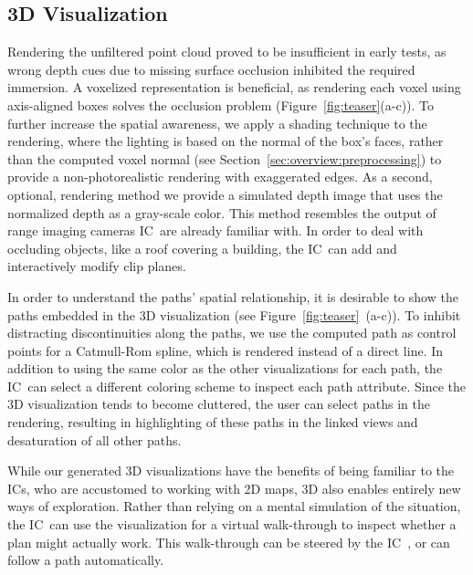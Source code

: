 \documentclass[conference,10pt,letter]{IEEEtran}
\def\IC{IC}
\begin{document}
\subsection{3D Visualization} \label{sec:overview:3dvisualization}
 Rendering the unfiltered point cloud proved to be insufficient in early tests, as wrong depth cues due to missing surface occlusion inhibited the required immersion. A voxelized representation is beneficial, as rendering each voxel using axis-aligned boxes solves the occlusion problem (Figure~\ref{fig:teaser}(a-c)). To further increase the spatial awareness, we apply a shading technique to the rendering, where the lighting is based on the normal of the box's faces, rather than the computed voxel normal (see Section~\ref{sec:overview:preprocessing}) to provide a non-photorealistic rendering with exaggerated edges. As a second, optional, rendering method we provide a simulated depth image that uses the normalized depth as a gray-scale color. This method resembles the output of range imaging cameras \IC\ are already familiar with. In order to deal with occluding objects, like a roof covering a building, the \IC\ can add and interactively modify clip planes.

 In order to understand the paths' spatial relationship, it is desirable to show the paths embedded in the 3D visualization (see Figure~\ref{fig:teaser}~(a-c)). To inhibit distracting discontinuities along the paths, we use the computed path as control points for a Catmull-Rom spline, which is rendered instead of a direct line. In addition to using the same color as the other visualizations for each path, the \IC\ can select a different coloring scheme to inspect each path attribute. Since the 3D visualization tends to become cluttered, the user can select paths in the rendering, resulting in highlighting of these paths in the linked views and desaturation of all other paths.

While our generated 3D visualizations have the benefits of being familiar to the \IC s, who are accustomed to working with 2D maps, 3D also enables entirely new ways of exploration. Rather than relying on a mental simulation of the situation, the \IC\ can use the visualization for a virtual walk-through to inspect whether a plan might actually work. This walk-through can be steered by the \IC\ , or can follow a path automatically.

\end{document}
